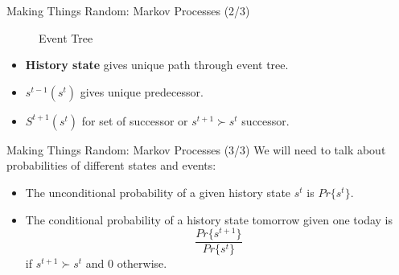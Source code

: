 \documentclass[10pt,c,aspectratio=1610,handout]{beamer}
\begin{document}
\begin{frame}{Making Things Random: Markov Processes (2/3)}%
  \begin{figure}[htp!]%
    \caption{Event Tree}\label{fig:eventtree}%
    \begin{center}%
    \end{center}%
  \end{figure}%
  \begin{itemize}%
    \item[$\blacktriangleright$] \textbf{History state} gives unique path through event tree.%
    \pause%
    \item[$\blacktriangleright$] $s^{t-1}(s^t)$ gives unique predecessor.%
    \pause%
    \item[$\blacktriangleright$] $S^{t+1}(s^t)$ for set of successor or $s^{t+1} \succ s^t$ successor.%
  \end{itemize}%
\end{frame}%
\begin{frame}{Making Things Random: Markov Processes (3/3)}%
  We will need to talk about probabilities of different states and events:\\%
  \vspace*{0.2in}%
  \pause%
  \begin{itemize}%
    \item[$\blacktriangleright$] The unconditional probability of a given history state $s^t$ is $Pr\{s^t\}$.%
    \vspace*{0.2in}%
    \pause%
    \item[$\blacktriangleright$] The conditional probability of a history state tomorrow given one today is \[ \frac{ Pr\{s^{t+1}\} }{ Pr\{s^t\}} \] if $s^{t+1} \succ s^t$ and 0 otherwise.%
  \end{itemize}%
\end{frame}%
\end{document}
